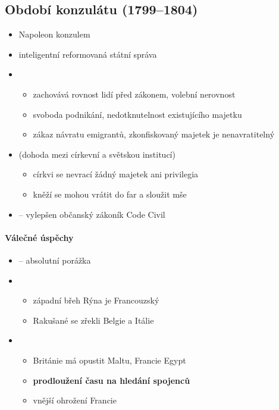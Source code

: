 \subsection{Období konzulátu (1799--1804)}
\begin{itemize}
\item Napoleon konzulem
\item inteligentní \ra reformovaná státní správa
\item {}
	\begin{itemize}
	\item zachovává rovnost lidí před zákonem, volební nerovnost
	\item svoboda podnikání, nedotknutelnost existujícího majetku
	\item zákaz návratu emigrantů, zkonfiskovaný majetek je nenavratitelný
	\end{itemize}
\item {} (dohoda mezi církevní a světskou institucí)
	\begin{itemize}
	\item církvi se nevrací žádný majetek ani privilegia
	\item kněží se mohou vrátit do far a sloužit mše
	\end{itemize}
\item {} -- vylepšen občanský zákoník Code Civil
\end{itemize}

\paragraph{Válečné úspěchy}
\begin{itemize}
\item {} -- absolutní porážka
\item {}
	\begin{itemize}
	\item západní břeh Rýna je Francouzský
	\item Rakušané se zřekli Belgie a Itálie
	\end{itemize}
\item {}
	\begin{itemize}
	\item Británie má opustit Maltu, Francie Egypt
	\item \textbf{prodloužení času na hledání spojenců}
	\item[\ra] vnější ohrožení Francie
	\end{itemize}
\end{itemize}

